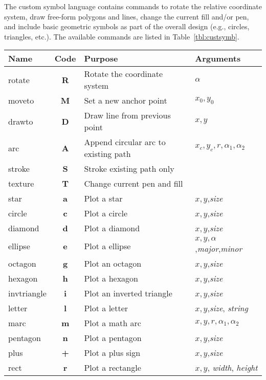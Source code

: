 The custom symbol language contains commands to rotate the relative coordinate system,
draw free-form polygons and lines, change the current fill and/or pen, and include basic
geometric symbols as part of the overall design (e.g., circles, triangles, etc.).
The available commands are listed in
Table~\ref{tbl:custsymb}.
\begin{table}[H]
\small
\centering
\begin{tabular}{|l|c|l|l|} \hline
Name 		& 	Code		&	Purpose				&	Arguments \\ \hline
rotate		&	\textbf{R}	& Rotate the coordinate system		& $\alpha$ \\ \hline
moveto		&	\textbf{M}	& Set a new anchor point 		& $x_0, y_0$  \\ \hline
drawto		&	\textbf{D}	& Draw line from previous point 	& $x, y$  \\ \hline
arc		&	\textbf{A}	& Append circular arc to existing path 	& $x_c, y_c, r, \alpha_1, \alpha_2$  \\ \hline
stroke		&	\textbf{S}	& Stroke existing path only 		&  \\ \hline \hline
texture		&	\textbf{T}	& Change current pen and fill		&  \\ \hline \hline
star		&	\textbf{a}	& Plot a star 				& $x, y$,\emph{size}  \\ \hline
circle		&	\textbf{c}	& Plot a circle 			& $x, y$,\emph{size}  \\ \hline
diamond		&	\textbf{d}	& Plot a diamond 			& $x, y$,\emph{size}  \\ \hline
ellipse		&	\textbf{e}	& Plot a ellipse 			& $x, y, \alpha$,\emph{major},\emph{minor}  \\ \hline
octagon		&	\textbf{g}	& Plot an octagon 			& $x, y$,\emph{size}  \\ \hline
hexagon		&	\textbf{h}	& Plot a hexagon 			& $x, y$,\emph{size}  \\ \hline
invtriangle	&	\textbf{i}	& Plot an inverted triangle		& $x, y$,\emph{size}  \\ \hline
letter		&	\textbf{l}	& Plot a letter 			& $x, y$,\emph{size}, \emph{string}  \\ \hline
marc		&	\textbf{m}	& Plot a math arc 			& $x, y, r, \alpha_1, \alpha_2$  \\ \hline
pentagon	&	\textbf{n}	& Plot a pentagon 			& $x, y$,\emph{size}  \\ \hline
plus		&	\textbf{+}	& Plot a plus sign 			& $x, y$,\emph{size}  \\ \hline
rect		&	\textbf{r}	& Plot a rectangle 			& $x, y$, \emph{width}, \emph{height}  \\ \hline

\end{tabular}
\end{table}
